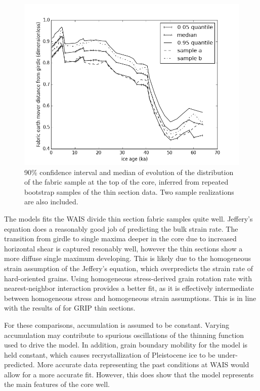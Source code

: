 \documentclass[TC, hvmath, online]{copernicus}
\begin{document}
{\begin{figure}
\caption{90\% confidence interval and median of evolution of the distribution of the fabric sample at the top of the core, inferred from repeated bootstrap samples of the thin section data. Two sample realizations are also included.}
\includegraphics[width=12cm]{ci}
\end{figure}
The models fits the WAIS divide thin section fabric samples quite well. Jeffery's equation does a reasonably good job of predicting the bulk strain rate.  The transition from girdle to single maxima deeper in the core due to increased horizontal shear is captured resonably well, however the thin sections show a more diffuse single maximum developing. This is likely due to the homogeneous strain assumption of the Jeffery's equation, which overpredicts the strain rate of hard-oriented grains. Using homogeneous stress-derived grain rotation rate with nearest-neighbor interaction provides a better fit, as it is effectively intermediate between homogeneous stress and homogeneous strain assumptions. This is in line with the results of \citet{thorsteinsson2002nni} for GRIP thin sections.

For these comparisons, accumulation is assumed to be constant. Varying accumulation may contribute to spurious oscillations of the thinning function used to drive the model. In addition, grain boundary mobility for the model is held constant, which causes recrystallization of Pleistocene ice to be under-predicted. More accurate data representing the past conditions at WAIS would allow for a more accurate fit. However, this does show that the model represents the main features of the core well. 


}
\end{document}
